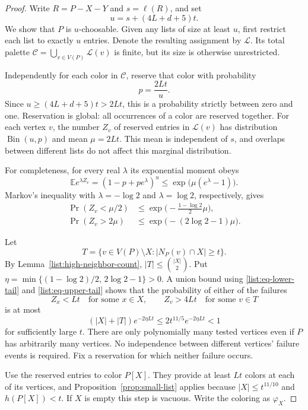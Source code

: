 \begin{proof}
Write $R=P-X-Y$ and $s=\ell(R)$, and set
\[
u=s+(4L+d+5)t.
\]
We show that $P$ is $u$-choosable. Given any lists of size at least $u$,
first restrict each list to exactly $u$ entries. Denote the resulting
assignment by $\mathcal L$. Its total palette
$\mathcal C=\bigcup_{v\in V(P)}\mathcal L(v)$ is finite, but its size is
otherwise unrestricted.

Independently for each color in $\mathcal C$, reserve that color with
probability
\[
p=\frac{2Lt}{u}.
\]
Since $u\ge(4L+d+5)t>2Lt$, this is a probability strictly between zero and
one. Reservation is global: all occurrences of a color are reserved
together. For each vertex $v$, the number $Z_v$ of reserved entries in
$\mathcal L(v)$ has distribution $\operatorname{Bin}(u,p)$ and mean
$\mu=2Lt$. This mean is independent of $s$, and overlaps between
different lists do not affect this marginal distribution.

For completeness, for every real $\lambda$ its exponential moment obeys
\[
\mathbb E e^{\lambda Z_v}
=(1-p+pe^\lambda)^u
\le\exp\bigl(\mu(e^\lambda-1)\bigr).
\]
Markov's inequality with $\lambda=-\log2$ and $\lambda=\log2$,
respectively, gives
\begin{align}
\Pr(Z_v<\mu/2)
&\le\exp\bigl(-\tfrac{1-\log2}{2}\mu\bigr),
\label{list:eq-lower-tail}\\
\Pr(Z_v>2\mu)
&\le\exp\bigl(-(2\log2-1)\mu\bigr).
\label{list:eq-upper-tail}
\end{align}

Let
\[
T=\{v\in V(P)\setminus X:|N_P(v)\cap X|\ge t\}.
\]
By Lemma~\ref{list:high-neighbor-count}, $|T|\le\binom{|X|}{2}$. Put
$\eta=\min\{(1-\log2)/2,\,2\log2-1\}>0$. A union bound using
\eqref{list:eq-lower-tail} and \eqref{list:eq-upper-tail} shows that the
probability of either of the failures
\[
Z_x<Lt\quad\text{for some }x\in X,
\qquad
Z_v>4Lt\quad\text{for some }v\in T
\]
is at most
\[
(|X|+|T|)e^{-2\eta Lt}
\le2t^{11/5}e^{-2\eta Lt}<1
\]
for sufficiently large $t$. There are only polynomially many tested
vertices even if $P$ has arbitrarily many vertices. No independence
between different vertices' failure events is required. Fix a reservation
for which neither failure occurs.

Use the reserved entries to color $P[X]$. They provide at least $Lt$
colors at each of its vertices, and Proposition~\ref{prop:small-list}
applies because $|X|\le t^{11/10}$ and $h(P[X])<t$. If $X$ is empty this
step is vacuous. Write the coloring as $\varphi_X$.


\end{proof}
